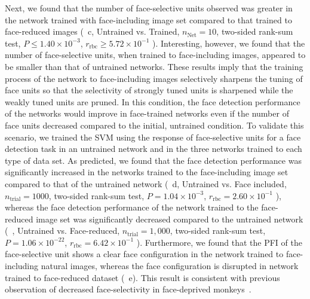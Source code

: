 \documentclass[sn-mathphys]{sn-jnl}%
\theoremstyle{thmstyleone}%
\theoremstyle{thmstyletwo}%
\theoremstyle{thmstylethree}%
\begin{document}
Next, we found that the number of face-selective units observed was greater in the network trained with face-including image set compared to that trained to face-reduced images 
(~c, Untrained vs. Trained,
$ n_\textrm{Net} = 10 $,
two-sided rank-sum test,
$ P \leq 1.40 \times 10 ^{-3} $,
$ r_\textrm{rbc} \geq 5.72 \times 10^{-1} $
).
Interesting, however, we found that the number of face-selective units, when trained to face-including images, appeared to be smaller than that of untrained networks.
These results imply that the training process of the network to face-including images selectively sharpens the tuning of face units so that the selectivity of strongly tuned units is sharpened while the weakly tuned units are pruned.
In this condition, the face detection performance of the networks would improve in face-trained networks even if the number of face units decreased compared to the initial, untrained condition.
To validate this scenario, we trained the SVM using the response of face-selective units for a face detection task in an untrained network and in the three networks trained to each type of data set.
As predicted, we found that the face detection performance was significantly increased in the networks trained to the face-including image set compared to that of the untrained network
(~d, Untrained vs. Face included, 
$ n_\textrm{trial} = 1000 $,
two-sided rank-sum test,
$ P = 1.04 \times 10^{-3} $,
$ r_\textrm{rbc} = 2.60 \times 10^{-1} $
),
whereas the face detection performance of the network trained to the face-reduced image set was significantly decreased compared to the untrained network
(~, Untrained vs. Face-reduced,
$ n_\textrm{trial} = 1,000 $,
two-sided rank-sum test,
$ P = 1.06 \times 10^{-22} $,
$ r_\textrm{rbc} = 6.42 \times 10^{-1} $
).
Furthermore, we found that the PFI of the face-selective unit shows a clear face configuration in the network trained to face-including natural images,
whereas the face configuration is disrupted in network trained to face-reduced dataset (~e).
This result is consistent with previous observation of decreased face-selectivity in face-deprived monkeys~\cite{arcaro2017seeing}.
\end{document}
